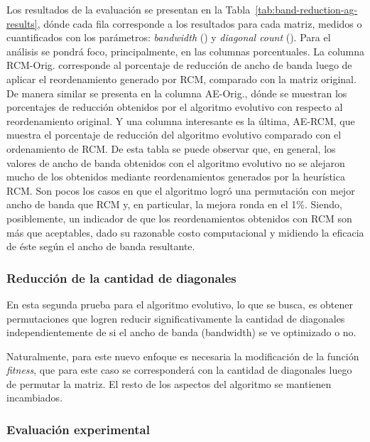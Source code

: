 Los resultados de la evaluación se presentan en la Tabla~\ref{tab:band-reduction-ag-results}, dónde cada fila corresponde a los resultados para cada matriz, medidos o cuantificados con los parámetros: \textit{bandwidth} (\bw) y \textit{diagonal count} (\dc). Para el análisis se pondrá foco, principalmente, en las columnas porcentuales. La columna RCM-Orig. corresponde al porcentaje de reducción de ancho de banda luego de aplicar el reordenamiento generado por RCM, comparado con la matriz original. De manera similar se presenta en la columna AE-Orig., dónde se muestran los porcentajes de reducción obtenidos por el algoritmo evolutivo con respecto al reordenamiento original. Y una columna interesante es la última, AE-RCM, que muestra el porcentaje de reducción del algoritmo evolutivo comparado con el ordenamiento de RCM. De esta tabla se puede observar que, en general, los valores de ancho de banda obtenidos con el algoritmo evolutivo no se alejaron mucho de los obtenidos mediante reordenamientos generados por la heurística RCM. Son pocos los casos en que el algoritmo logró una permutación con mejor ancho de banda que RCM y, en particular, la mejora ronda en el 1\%. Siendo, posiblemente, un indicador de que los reordenamientos obtenidos con RCM son más que aceptables, dado su razonable costo computacional y midiendo la eficacia de éste según el ancho de banda resultante. 



\subsubsection{Reducción de la cantidad de diagonales}\label{sec:diag-reduction-ag}

En esta segunda prueba para el algoritmo evolutivo, lo que se busca, es obtener permutaciones que logren reducir significativamente la cantidad de diagonales independientemente de si el ancho de banda (bandwidth) se ve optimizado o no.

Naturalmente, para este nuevo enfoque es necesaria la modificación de la función \textit{fitness}, que para este caso se corresponderá con la cantidad de diagonales luego de permutar la matriz. El resto de los aspectos del algoritmo se mantienen incambiados.

\subsubsection*{Evaluación experimental}

